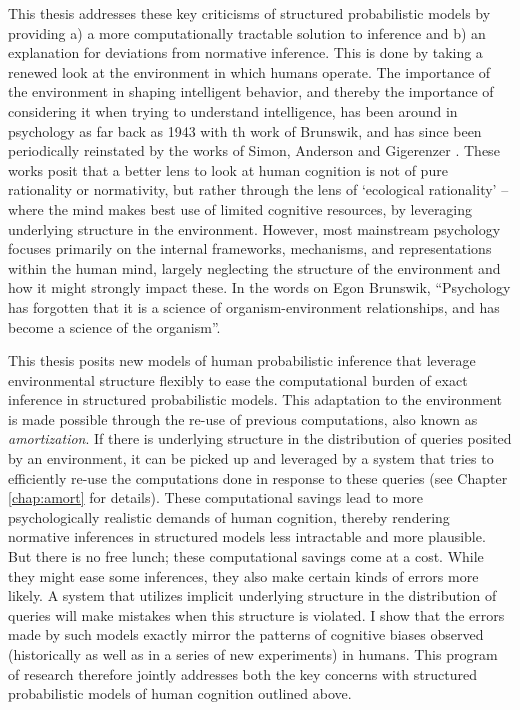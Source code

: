 This thesis addresses these key criticisms of structured probabilistic models by providing a) a more computationally tractable solution to inference and b) an explanation for deviations from normative inference. This is done by taking a renewed look at the environment in which humans operate. The importance of the environment in shaping intelligent behavior, and thereby the importance of considering it when trying to understand intelligence, has been around in psychology as far back as 1943 with th work of Brunswik\cite{brunswik1943organismic}, and has since been periodically reinstated by the works of Simon\cite{simon1956rational}, Anderson\cite{anderson1990adaptive} and Gigerenzer \cite{gigerenzer1999simple}. These works posit that a better lens to look at human cognition is not of pure rationality or normativity, but rather through the lens of `ecological rationality' -- where the mind makes best use of limited cognitive resources, by leveraging underlying structure in the environment. However, most mainstream psychology focuses primarily on the internal frameworks, mechanisms, and representations within the human mind, largely neglecting the structure of the environment and how it might strongly impact these. In the words on Egon Brunswik, ``Psychology has forgotten that it is a science of organism-environment relationships, and has become a science of the organism''.  

This thesis posits new models of human probabilistic inference that leverage environmental structure flexibly to ease the computational burden of exact inference in structured probabilistic models. This adaptation to the environment is made possible through the re-use of previous computations, also known as \textit{amortization}. If there is underlying structure in the distribution of queries posited by an environment, it can be picked up and leveraged by a system that tries to efficiently re-use the computations done in response to these queries (see Chapter \ref{chap:amort} for details). These computational savings lead to more psychologically realistic demands of human cognition, thereby rendering normative inferences in structured models less intractable and more plausible. But there is no free lunch; these computational savings come at a cost. While they might ease some inferences, they also make certain kinds of errors more likely. A system that utilizes implicit underlying structure in the distribution of queries will make mistakes when this structure is violated. I show that the errors made by such models exactly mirror the patterns of cognitive biases observed (historically as well as in a series of new experiments) in humans. This program of research therefore jointly addresses both the key concerns with structured probabilistic models of human cognition outlined above.

